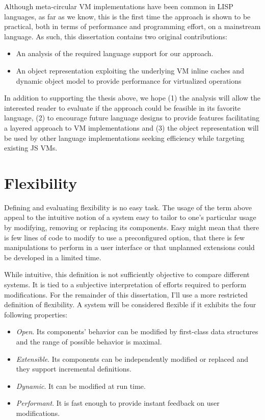 Although meta-circular VM implementations have been common in LISP languages,
as far as we know, this is the first time the approach is shown to be practical,
both in terms of performance and programming effort, on a mainstream language.
As such, this dissertation contains two original contributions:
\begin{itemize}
    \item An analysis of the required language support for our approach.     
    \item An object representation exploiting the underlying VM inline caches
        and dynamic object model to provide performance for virtualized
        operations
\end{itemize}

In addition to supporting the thesis above, we hope (1) the analysis will allow
the interested reader to evaluate if the approach could be feasible in its
favorite language, (2) to encourage future language designs to provide features
facilitating a layered approach to VM implementations and (3) the object
representation will be used by other language implementations seeking
efficiency while targeting existing JS VMs.

\section{Flexibility}

Defining and evaluating flexibility is no easy task. The usage of the term
above appeal to the intuitive notion of a system easy to tailor to one's
particular usage by modifying, removing or replacing its components. Easy might
mean that there is few lines of code to modify to use a preconfigured option,
that there is few manipulations to perform in a user interface or that unplanned
extensions could be developed in a limited time.

While intuitive, this definition is not sufficiently objective to compare
different systems. It is tied to a subjective interpretation of efforts required to
perform modifications. For the remainder of this dissertation, I'll use a more
restricted definition of flexibility. A system will be considered flexible if
it exhibits the four following properties:

\begin{itemize}
    \item \textit{Open}. Its components' behavior can be modified by
        first-class data structures and the range of possible behavior is
        maximal. 

    \item \textit{Extensible}. Its components can be independently modified or
        replaced and they support incremental definitions. 

    \item \textit{Dynamic}. It can be modified at run time.

    \item \textit{Performant}. It is fast enough to provide instant feedback on
        user modifications.
\end{itemize}

